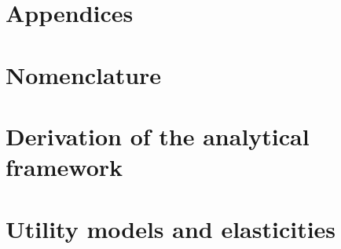 \documentclass[12pt]{article}\usepackage[]{graphicx}\usepackage[]{xcolor}
\begin{document}
{
\scriptsize

}


\clearpage

\appendix
{}

\section*{Appendices}

\renewcommand{\thesection}{\Alph{section}}


\section{Nomenclature}
\label{sec:nomenclature}




\section{Derivation of the analytical framework}
\label{sec:derivation}




\section{Utility models and elasticities}
\label{sec:utility_and_elasticities}


\end{document}
